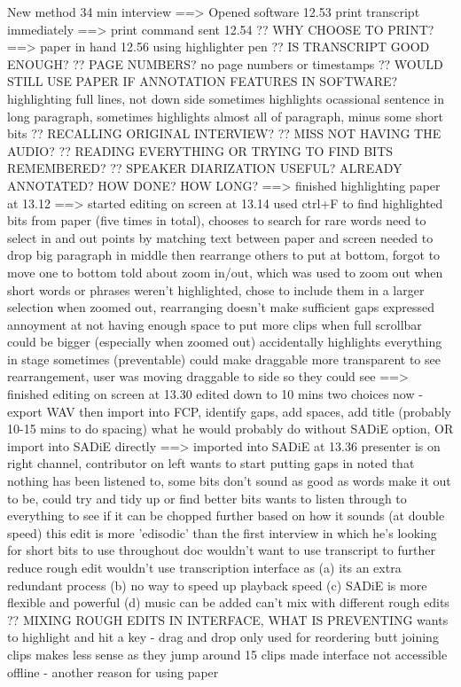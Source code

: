 New method
34 min interview
==> Opened software 12.53
print transcript immediately
==> print command sent 12.54
?? WHY CHOOSE TO PRINT?
==> paper in hand 12.56
using highlighter pen
?? IS TRANSCRIPT GOOD ENOUGH?
?? PAGE NUMBERS?
no page numbers or timestamps
?? WOULD STILL USE PAPER IF ANNOTATION FEATURES IN SOFTWARE?
highlighting full lines, not down side
sometimes highlights ocassional sentence in long paragraph, sometimes highlights almost all of paragraph, minus some short bits
?? RECALLING ORIGINAL INTERVIEW?
?? MISS NOT HAVING THE AUDIO?
?? READING EVERYTHING OR TRYING TO FIND BITS REMEMBERED?
?? SPEAKER DIARIZATION USEFUL? ALREADY ANNOTATED? HOW DONE? HOW LONG?
==> finished highlighting paper at 13.12
==> started editing on screen at 13.14
used ctrl+F to find highlighted bits from paper (five times in total), chooses to search for rare words
need to select in and out points by matching text between paper and screen
needed to drop big paragraph in middle then rearrange others to put at bottom, forgot to move one to bottom
told about zoom in/out, which was used to zoom out
when short words or phrases weren't highlighted, chose to include them in a larger selection
when zoomed out, rearranging doesn't make sufficient gaps
expressed annoyment at not having enough space to put more clips when full
scrollbar could be bigger (especially when zoomed out)
accidentally highlights everything in stage sometimes (preventable)
could make draggable more transparent to see rearrangement, user was moving draggable to side so they could see
==> finished editing on screen at 13.30
edited down to 10 mins
two choices now - export WAV then import into FCP, identify gaps, add spaces, add title (probably 10-15 mins to do spacing) what he would probably do without SADiE option, OR import into SADiE directly
==> imported into SADiE at 13.36
presenter is on right channel, contributor on left
wants to start putting gaps in
noted that nothing has been listened to, some bits don't sound as good as words make it out to be, could try and tidy up or find better bits
wants to listen through to everything to see if it can be chopped further based on how it sounds (at double speed)
this edit is more 'edisodic' than the first interview in which he's looking for short bits to use throughout doc
wouldn't want to use transcript to further reduce rough edit
wouldn't use transcription interface as (a) its an extra redundant process (b) no way to speed up playback speed (c) SADiE is more flexible and powerful (d) music can be added
can't mix with different rough edits
?? MIXING ROUGH EDITS IN INTERFACE, WHAT IS PREVENTING
wants to highlight and hit a key - drag and drop only used for reordering
butt joining clips makes less sense as they jump around
15 clips made
interface not accessible offline - another reason for using paper

